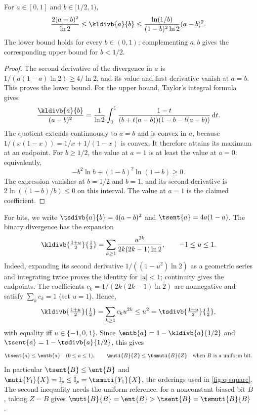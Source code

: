 \begin{lemma}
\label{lem:binary-divergence-comparison}
For $a\in[0,1]$ and $b\in[1/2,1)$,
\begin{equation*}
  \frac{2(a-b)^2}{\ln2}
  \le\kldivb{a}{b}
  \le\frac{\ln(1/b)}{(1-b)^2\ln2}(a-b)^2.
\end{equation*}
The lower bound holds for every $b\in(0,1)$; complementing
$a,b$ gives the corresponding upper bound for $b<1/2$.
\end{lemma}
\begin{proof}
The second derivative of the divergence in $a$ is
$1/(a(1-a)\ln2)\ge4/\ln2$, and its value and first derivative
vanish at $a=b$. This proves the lower bound.
For the upper bound, Taylor's integral formula gives
\begin{equation*}
  \frac{\kldivb{a}{b}}{(a-b)^2}
  =\frac1{\ln2}\int_0^1
  \frac{1-t}{(b+t(a-b))(1-b-t(a-b))}\,\mathrm dt.
\end{equation*}
The quotient extends continuously to $a=b$ and is convex in
$a$, because $1/(x(1-x))=1/x+1/(1-x)$ is convex.
It therefore attains its maximum at an endpoint.
For $b\ge1/2$, the value at $a=1$ is at least the value at
$a=0$: equivalently,
\begin{equation*}
  -b^2\ln b+(1-b)^2\ln(1-b)\ge0.
\end{equation*}
The expression vanishes at $b=1/2$ and $b=1$, and its second
derivative is $2\ln((1-b)/b)\le0$ on this interval.
The value at $a=1$ is the claimed coefficient.
\end{proof}

For bits, we write $\tsdivb{a}{b}=4(a-b)^2$ and
$\tsent{a}=4a(1-a)$.
The binary divergence has the expansion
\begin{equation}
  \label{eq:binary-divergence-series}
  \kldivb{\tfrac{1+u}{2}}{\tfrac12}
  =\sum_{k\ge1}\frac{u^{2k}}{2k(2k-1)\ln2},
  \qquad -1\le u\le1.
\end{equation}
Indeed, expanding its second derivative
$1/((1-u^2)\ln2)$ as a geometric series and integrating twice
proves the identity for $|u|<1$; continuity gives the endpoints.
The coefficients $c_k=1/(2k(2k-1)\ln2)$ are nonnegative and
satisfy $\sum_k c_k=1$ (set $u=1$). Hence,
\begin{equation*}
  \kldivb{\tfrac{1+u}2}{\tfrac12}=\sum_{k\ge1}c_ku^{2k}
  \le u^2=\tsdivb{\tfrac{1+u}2}{\tfrac12},
\end{equation*}
with equality iff $u\in\{-1,0,1\}$. Since
$\entb{a}=1-\kldivb{a}{1/2}$ and
$\tsent{a}=1-\tsdivb{a}{1/2}$, this gives
\begin{equation*}
  \tsent{a}\le\entb{a}\quad(0\le a\le1),
  \qquad
  \muti{B}{Z}\le\tsmuti{B}{Z}\quad\text{when $B$ is a uniform bit}.
\end{equation*}
In particular $\tsent{B}\le\ent{B}$ and
$\muti{Y_1}{X}=\sI\le\qI=\tsmuti{Y_1}{X}$,
the orderings used in \autoref{fig:q-square}. The second
inequality needs the uniform reference: for a nonconstant biased
bit $B$, taking $Z=B$ gives
$\muti{B}{B}=\ent{B}>\tsent{B}=\tsmuti{B}{B}$.

